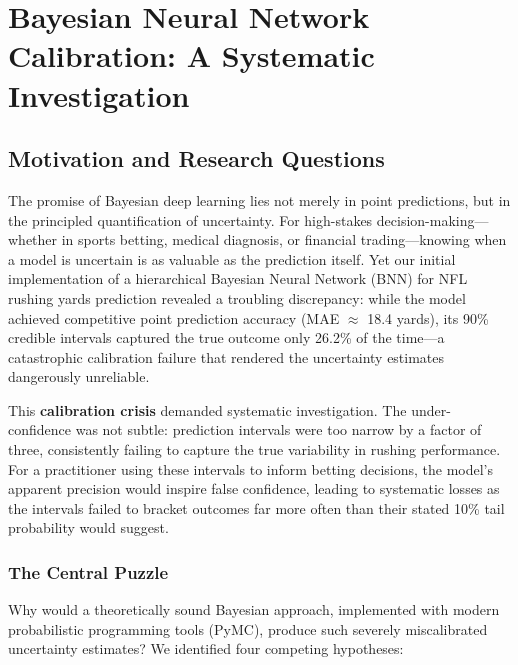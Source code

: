 \section{Bayesian Neural Network Calibration: A Systematic Investigation}
\label{sec:bnn_calibration_study}

\subsection{Motivation and Research Questions}
\label{subsec:bnn_calibration_motivation}

The promise of Bayesian deep learning lies not merely in point predictions, but in the principled quantification of uncertainty. For high-stakes decision-making—whether in sports betting, medical diagnosis, or financial trading—knowing when a model is uncertain is as valuable as the prediction itself. Yet our initial implementation of a hierarchical Bayesian Neural Network (BNN) for NFL rushing yards prediction revealed a troubling discrepancy: while the model achieved competitive point prediction accuracy (MAE $\approx$ 18.4 yards), its 90\% credible intervals captured the true outcome only 26.2\% of the time—a catastrophic calibration failure that rendered the uncertainty estimates dangerously unreliable.

This \textbf{calibration crisis} demanded systematic investigation. The under-confidence was not subtle: prediction intervals were too narrow by a factor of three, consistently failing to capture the true variability in rushing performance. For a practitioner using these intervals to inform betting decisions, the model's apparent precision would inspire false confidence, leading to systematic losses as the intervals failed to bracket outcomes far more often than their stated 10\% tail probability would suggest.

\subsubsection{The Central Puzzle}

Why would a theoretically sound Bayesian approach, implemented with modern probabilistic programming tools (PyMC), produce such severely miscalibrated uncertainty estimates? We identified four competing hypotheses:

